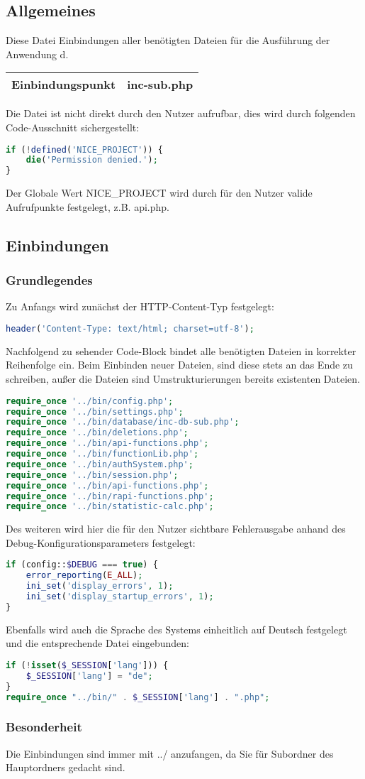 \subsection{Allgemeines} Diese Datei Einbindungen aller benötigten Dateien für die Ausführung der Anwendung d.
\begin{table}[H]
	\begin{tabular}{|c|p{11cm}|}
		\hline
		\textbf{Einbindungspunkt} & inc-sub.php \\ \hline
	\end{tabular}
\end{table}
Die Datei ist nicht direkt durch den Nutzer aufrufbar, dies wird durch folgenden Code-Ausschnitt sichergestellt:
\begin{lstlisting}[language=php]
if (!defined('NICE_PROJECT')) {
	die('Permission denied.');
}
\end{lstlisting}
Der Globale Wert {\glqq NICE\_PROJECT\grqq} wird durch für den Nutzer valide Aufrufpunkte festgelegt, z.B. {\glqq api.php\grqq}.
\newpage
\subsection{Einbindungen}
\subsubsection{Grundlegendes}
Zu Anfangs wird zunächst der HTTP-Content-Typ festgelegt:
\begin{lstlisting}[language=php]
header('Content-Type: text/html; charset=utf-8');
\end{lstlisting}
Nachfolgend zu sehender Code-Block bindet alle benötigten Dateien in korrekter Reihenfolge ein. Beim Einbinden neuer Dateien, sind diese stets an das Ende zu schreiben, außer die Dateien sind Umstrukturierungen bereits existenten Dateien.
\begin{lstlisting}[language=php]
require_once '../bin/config.php';
require_once '../bin/settings.php';
require_once '../bin/database/inc-db-sub.php';
require_once '../bin/deletions.php';
require_once '../bin/api-functions.php';
require_once '../bin/functionLib.php';
require_once '../bin/authSystem.php';
require_once '../bin/session.php';
require_once '../bin/api-functions.php';
require_once '../bin/rapi-functions.php';
require_once '../bin/statistic-calc.php';
\end{lstlisting}
Des weiteren wird hier die für den Nutzer sichtbare Fehlerausgabe anhand des Debug-Konfigurationsparameters festgelegt:
\begin{lstlisting}[language=php]
if (config::$DEBUG === true) {
	error_reporting(E_ALL);
	ini_set('display_errors', 1);
	ini_set('display_startup_errors', 1);
}
\end{lstlisting}
Ebenfalls wird auch die Sprache des Systems einheitlich auf Deutsch festgelegt und die entsprechende Datei eingebunden:
\begin{lstlisting}[language=php]
if (!isset($_SESSION['lang'])) {
	$_SESSION['lang'] = "de";
}
require_once "../bin/" . $_SESSION['lang'] . ".php";
\end{lstlisting}
\subsubsection{Besonderheit}
Die Einbindungen sind immer mit {\glqq ../\grqq} anzufangen, da Sie für Subordner des Hauptordners gedacht sind.